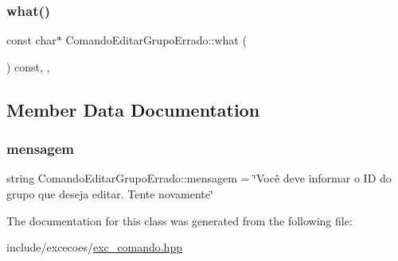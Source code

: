 \subsubsection{\texorpdfstring{what()}{what()}}
{\footnotesize\ttfamily const char$\ast$ Comando\+Editar\+Grupo\+Errado\+::what (\begin{DoxyParamCaption}{ }\end{DoxyParamCaption}) const\hspace{0.3cm}{\ttfamily [inline]}, {\ttfamily [override]}, {\ttfamily [noexcept]}}



\subsection{Member Data Documentation}
\mbox{\label{classComandoEditarGrupoErrado_a9055ba079abfac17438aece597eb90d8}} 
\subsubsection{\texorpdfstring{mensagem}{mensagem}}
{\footnotesize\ttfamily string Comando\+Editar\+Grupo\+Errado\+::mensagem = \char`\"{}Você deve informar o ID do grupo que deseja editar. Tente novamente\char`\"{}\hspace{0.3cm}{\ttfamily [private]}}



The documentation for this class was generated from the following file\+:\begin{DoxyCompactItemize}
\item 
include/excecoes/\hyperlink{exc__comando_8hpp}{exc\+\_\+comando.\+hpp}\end{DoxyCompactItemize}
